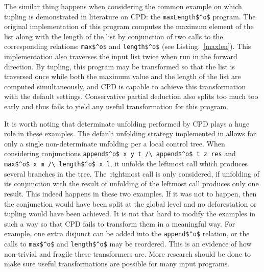 The similar thing happens when considering the common example on which tupling is demonstrated in literature on CPD: the \lstinline{maxLength$^o$} program.
The original implementation of this program computes the maximum element of the list along with the length of the list by conjunction of two calls to the corresponding relations: \lstinline{max$^o$} and \lstinline{length$^o$} (see Listing.~\ref{maxlen}).
This implementation also traverses the input list twice when run in the forward direction.
By tupling, this program may be transformed so that the list is traversed once while both the maximum value and the length of the list are computed simultaneously, and CPD is capable to achieve this transformation with the default settings.
Conservative partial deduction also splits too much too early and thus fails to yield any useful transformation for this program.

It is worth noting that determinate unfolding performed by CPD plays a huge role in these examples.
The default unfolding strategy implemented in \ecce allows for only a single non-determinate unfolding per a local control tree.
When considering conjunctions \lstinline{append$^o$ x y t /\ append$^o$ t z res} and \lstinline{max$^o$ x m /\ length$^o$ x l}, it unfolds the leftmost call which produces several branches in the tree.
The~rightmost call is only considered, if unfolding of its conjunction with the result of unfolding of the leftmost call produces only one result.
This indeed happens in these two examples.
If it was not to happen, then the conjunction would have been split at the global level and no deforestation or tupling would have been achieved.
It is not that hard to modify the examples in such a way so that CPD fails to transform them in a meaningful way.
For example, one extra disjunct can be added into the \lstinline{append$^o$} relation, or the calls to \lstinline{max$^o$} and \lstinline{length$^o$} may be reordered.
This is an evidence of how non-trivial and fragile these transformers are.
More research should be done to make sure useful transformations are possible for many input programs.


